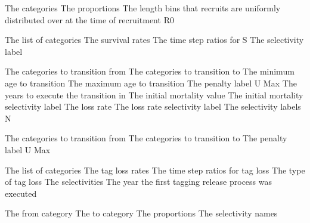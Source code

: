 \par\textbf{}\par
{} {The categories}
 {The proportions}
 {The length bins that recruits are uniformly distributed over at the time of recruitment}
 {R0}
\par\textbf{}\par
{} {The list of categories}
 {The survival rates}
 {The time step ratios for S}
 {The selectivity label}
\par\textbf{}\par
{} {The categories to transition from}
 {The categories to transition to}
 {The minimum age to transition}
 {The maximum age to transition}
 {The penalty label}
 {U Max}
 {The years to execute the transition in}
 {The initial mortality value}
 {The initial mortality selectivity label}
 {The loss rate}
 {The loss rate selectivity label}
 {The selectivity labels}
 {N}
\par\textbf{}\par
{} {The categories to transition from}
 {The categories to transition to}
 {The penalty label}
 {U Max}
 {}
 {}
 {}
 {}
\par\textbf{}\par
{} {The list of categories}
 {The tag loss rates}
 {The time step ratios for tag loss}
 {The type of tag loss}
 {The selectivities}
 {The year the first tagging release process was executed}
\par\textbf{}\par
{} {The from category}
 {The to category}
 {The proportions}
 {The selectivity names}
